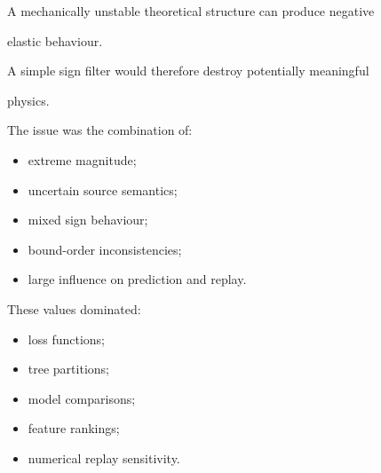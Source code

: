 \documentclass[11pt,a4paper,oneside]{report}
\begin{document}
A mechanically unstable theoretical structure can produce negative

elastic behaviour.



A simple sign filter would therefore destroy potentially meaningful

physics.



The issue was the combination of:



\begin{itemize}



\item

extreme magnitude;



\item

uncertain source semantics;



\item

mixed sign behaviour;



\item

bound-order inconsistencies;



\item

large influence on prediction and replay.



\end{itemize}



These values dominated:



\begin{itemize}



\item

loss functions;



\item

tree partitions;



\item

model comparisons;



\item

feature rankings;



\item

numerical replay sensitivity.



\end{itemize}
\end{document}
